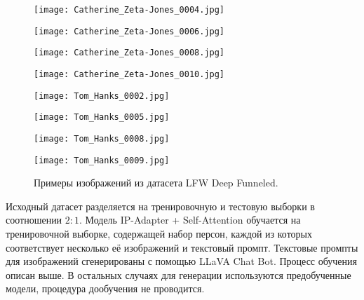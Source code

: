 \documentclass{article}
\begin{document}
\begin{figure}[H]
\begin{minipage}{.25\textwidth}
    \centering
    \texttt{[image: Catherine\_Zeta-Jones\_0004.jpg]}
    \label{fig:1}
\end{minipage}%
\begin{minipage}{.25\textwidth}
    \centering
    \texttt{[image: Catherine\_Zeta-Jones\_0006.jpg]}
    \label{fig:2}
\end{minipage}%
\begin{minipage}{.25\textwidth}
    \centering
    \texttt{[image: Catherine\_Zeta-Jones\_0008.jpg]}
    \label{fig:3}
\end{minipage}%
\begin{minipage}{.25\textwidth}
    \centering
    \texttt{[image: Catherine\_Zeta-Jones\_0010.jpg]}
    \label{fig:4}
\end{minipage}%
\vspace{-12pt}
\begin{minipage}{.25\textwidth}
    \centering
    \texttt{[image: Tom\_Hanks\_0002.jpg]}
    \label{fig:11}
\end{minipage}%
\begin{minipage}{.25\textwidth}
    \centering
    \texttt{[image: Tom\_Hanks\_0005.jpg]}
    \label{fig:21}
\end{minipage}%
\begin{minipage}{.25\textwidth}
    \centering
    \texttt{[image: Tom\_Hanks\_0008.jpg]}
    \label{fig:31}
\end{minipage}%
\begin{minipage}{.25\textwidth}
    \centering
    \texttt{[image: Tom\_Hanks\_0009.jpg]}
    \label{fig:41}
\end{minipage}%
\caption{Примеры изображений из датасета LFW Deep Funneled.}
\end{figure}

Исходный датасет разделяется на тренировочную и тестовую выборки в соотношении $2:1$. Модель IP-Adapter + Self-Attention обучается на тренировочной выборке, содержащей набор персон, каждой из которых соответствует несколько её изображений и текстовый промпт. Текстовые промпты для изображений сгенерированы с помощью LLaVA Chat Bot. Процесс обучения описан выше. В остальных случаях для генерации используются предобученные модели, процедура дообучения не проводится. 
\end{document}
